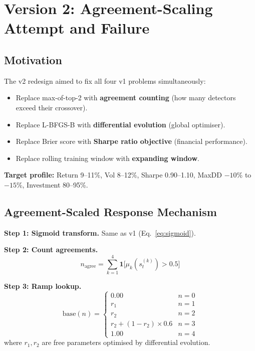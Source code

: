 \documentclass[11pt,a4paper]{article}
\begin{document}
\section{Version 2: Agreement-Scaling Attempt and Failure}
\label{sec:v2-attempt}

\subsection{Motivation}

The v2 redesign aimed to fix all four v1 problems simultaneously:
\begin{itemize}[nosep]
  \item Replace max-of-top-2 with \textbf{agreement counting} (how many detectors exceed their crossover).
  \item Replace L-BFGS-B with \textbf{differential evolution} (global optimiser).
  \item Replace Brier score with \textbf{Sharpe ratio objective} (financial performance).
  \item Replace rolling training window with \textbf{expanding window}.
\end{itemize}

\textbf{Target profile:} Return 9--11\%, Vol 8--12\%, Sharpe 0.90--1.10, MaxDD $-10$\% to $-15$\%, Investment 80--95\%.

\subsection{Agreement-Scaled Response Mechanism}

\textbf{Step 1: Sigmoid transform.} Same as v1 (Eq.~\ref{eq:sigmoid}).

\textbf{Step 2: Count agreements.}
\begin{equation}
  n_{\mathrm{agree}} = \sum_{k=1}^{4} \mathbf{1}\big[\mu_k(s_t^{(k)}) > 0.5\big]
\end{equation}

\textbf{Step 3: Ramp lookup.}
\begin{equation}
  \mathrm{base}(n) = \begin{cases}
    0.00 & n = 0 \\
    r_1   & n = 1 \\
    r_2   & n = 2 \\
    r_2 + (1-r_2) \times 0.6 & n = 3 \\
    1.00 & n = 4
  \end{cases}
  \label{eq:ramp}
\end{equation}
where $r_1, r_2$ are free parameters optimised by differential evolution.
\end{document}
